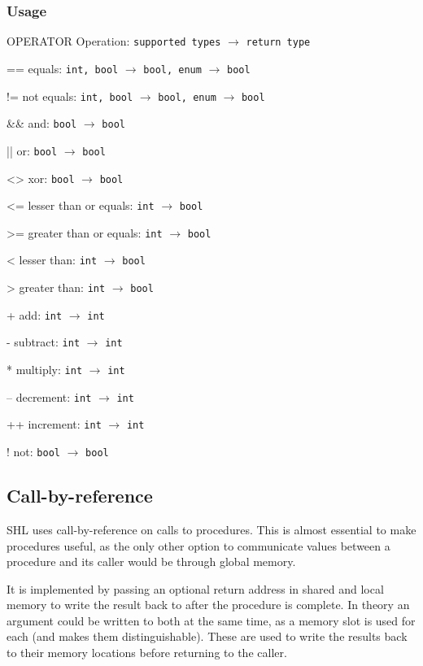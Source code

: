 \documentclass[twoside]{report}
\newenvironment{mycompactdesc}{\begin{adjustwidth}{0.53cm}{}\begin{compactdesc}}{\end{compactdesc}\end{adjustwidth}}
\begin{document}
\subsubsection*{Usage}
\begin{mycompactdesc}
	\item[OPERATOR] Operation: \texttt{supported types} $\rightarrow$ \texttt{return type}
	\item[==] equals: \texttt{int, bool} $\rightarrow$ \texttt{bool, enum} $\rightarrow$ \texttt{bool}
	\item[!=] not equals: \texttt{int, bool} $\rightarrow$ \texttt{bool, enum} $\rightarrow$ \texttt{bool}
	\item[\&\&] and: \texttt{bool} $\rightarrow$ \texttt{bool}
	\item[||] or: \texttt{bool} $\rightarrow$ \texttt{bool}
	\item[<>] xor: \texttt{bool} $\rightarrow$ \texttt{bool}
	\item[<=] lesser than or equals: \texttt{int} $\rightarrow$ \texttt{bool}
	\item[>=] greater than or equals: \texttt{int} $\rightarrow$ \texttt{bool}
	\item[<] lesser than: \texttt{int} $\rightarrow$ \texttt{bool}
	\item[>] greater than: \texttt{int} $\rightarrow$ \texttt{bool}
	\item[+] add: \texttt{int} $\rightarrow$ \texttt{int}
	\item[-] subtract: \texttt{int} $\rightarrow$ \texttt{int}
	\item[*] multiply: \texttt{int} $\rightarrow$ \texttt{int}
	\item[--] decrement: \texttt{int} $\rightarrow$ \texttt{int}
	\item[++] increment: \texttt{int} $\rightarrow$ \texttt{int}
	\item[!] not: \texttt{bool} $\rightarrow$ \texttt{bool}
\end{mycompactdesc}


\subsection{Call-by-reference}
\label{def:call-by-reference}
SHL uses call-by-reference on calls to procedures. This is almost essential to make procedures useful, as the only other option to communicate values between a procedure and its caller would be through global memory. 

It is implemented by passing an optional return address in shared and local memory to write the result back to after the procedure is complete. In theory an argument could be written to both at the same time, as a memory slot is used for each (and makes them distinguishable). These are used to write the results back to their memory locations before returning to the caller.
\end{document}
